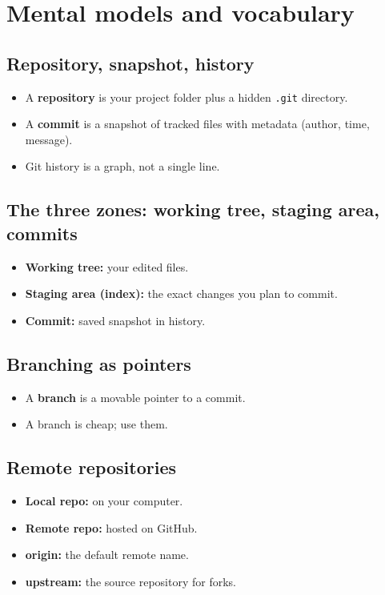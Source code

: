 \section{Mental models and vocabulary}
\subsection{Repository, snapshot, history}
\begin{itemize}
\item A \textbf{repository} is your project folder plus a hidden \texttt{.git} directory.
\item A \textbf{commit} is a snapshot of tracked files with metadata (author, time, message).
\item Git history is a graph, not a single line.
\end{itemize}

\subsection{The three zones: working tree, staging area, commits}
\begin{itemize}
\item \textbf{Working tree:} your edited files.
\item \textbf{Staging area (index):} the exact changes you plan to commit.
\item \textbf{Commit:} saved snapshot in history.
\end{itemize}

\subsection{Branching as pointers}
\begin{itemize}
\item A \textbf{branch} is a movable pointer to a commit.
\item A branch is cheap; use them.
\end{itemize}

\subsection{Remote repositories}
\begin{itemize}
\item \textbf{Local repo:} on your computer.
\item \textbf{Remote repo:} hosted on GitHub.
\item \textbf{origin:} the default remote name.
\item \textbf{upstream:} the source repository for forks.
\end{itemize}

